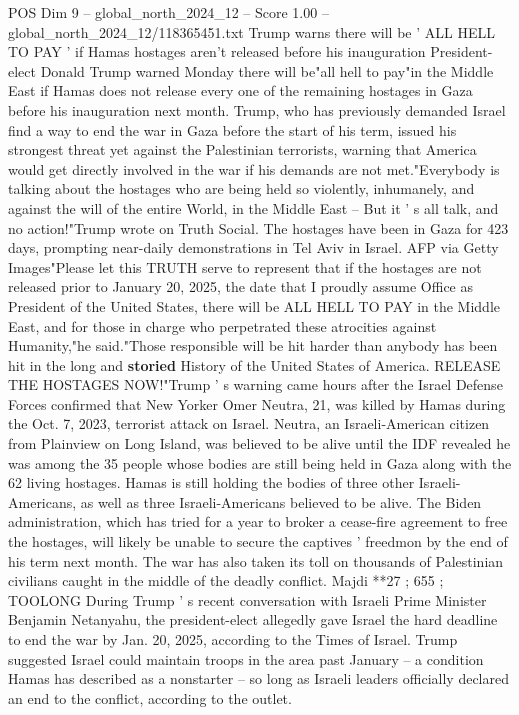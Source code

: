 \begin{textsample}{POS Dim 9 – global\_north\_2024\_12 – Score 1.00 – global\_north\_2024\_12/118365451.txt}  \label{ex:f9_pos_340}
Trump warns there will be ' ALL HELL TO PAY ' if Hamas hostages aren't released before his inauguration President-elect Donald Trump warned Monday there will be"all hell to pay"in the Middle East if Hamas does not release every one of the remaining hostages in Gaza before his inauguration next month.
Trump, who has previously demanded Israel find a way to end the war in Gaza before the start of his term, issued his strongest threat yet against the Palestinian terrorists, warning that America would get directly involved in the war if his demands are not met."Everybody is talking about the hostages who are being held so violently, inhumanely, and against the will of the entire World, in the Middle East -- But it ' s all talk, and no action!"Trump wrote on Truth Social.
The hostages have been in Gaza for 423 days, prompting near-daily demonstrations in Tel Aviv in Israel.
AFP via Getty Images"Please let this TRUTH serve to represent that if the hostages are not released prior to January 20, 2025, the date that I proudly assume Office as President of the United States, there will be ALL HELL TO PAY in the Middle East, and for those in charge who perpetrated these atrocities against Humanity,"he said."Those responsible will be hit harder than anybody has been hit in the long and \textbf{storied} History of the United States of America.
RELEASE THE HOSTAGES NOW!"Trump ' s warning came hours after the Israel Defense Forces confirmed that New Yorker Omer Neutra, 21, was killed by Hamas during the Oct. 7, 2023, terrorist attack on Israel.
Neutra, an Israeli-American citizen from Plainview on Long Island, was believed to be alive until the IDF revealed he was among the 35 people whose bodies are still being held in Gaza along with the 62 living hostages.
Hamas is still holding the bodies of three other Israeli-Americans, as well as three Israeli-Americans believed to be alive.
The Biden administration, which has tried for a year to broker a cease-fire agreement to free the hostages, will likely be unable to secure the captives ' freedmon by the end of his term next month.
The war has also taken its toll on thousands of Palestinian civilians caught in the middle of the deadly conflict.
Majdi **27 ; 655 ; TOOLONG During Trump ' s recent conversation with Israeli Prime Minister Benjamin Netanyahu, the president-elect allegedly gave Israel the hard deadline to end the war by Jan. 20, 2025, according to the Times of Israel.
Trump suggested Israel could maintain troops in the area past January -- a condition Hamas has described as a nonstarter -- so long as Israeli leaders officially declared an end to the conflict, according to the outlet.

\end{textsample}
